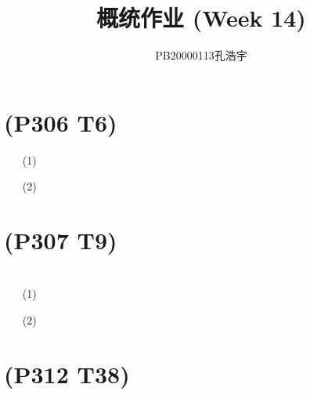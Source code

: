 \documentclass{article}
\title{概统作业 (Week 14)}
\author{PB20000113孔浩宇}
\begin{document}
\maketitle
\section{(P306 T6)}  %
\begin{enumerate}
    \item [(1)]
    \item [(2)]
\end{enumerate}

\section{(P307 T9)}  %


\section{}  %
\begin{enumerate}
    \item [(1)]
    \item [(2)]
\end{enumerate}

\section{(P312 T38)}  %



\section{}  %
\end{document}
